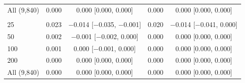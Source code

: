 \begin{tabular}{lcccc}
All (9{,}840) & 0.000 & 0.000 [0.000, 0.000] & 0.000 & 0.000 [0.000, 0.000] \\
\addlinespace
\multicolumn{5}{@{}l}{\textit{Heart, XGBoost}} \\
25 & 0.023 & $-$0.014 [$-$0.035, $-$0.001] & 0.020 & $-$0.014 [$-$0.041, 0.000] \\
50 & 0.002 & $-$0.001 [$-$0.002, 0.000] & 0.000 & 0.000 [0.000, 0.000] \\
100 & 0.001 & 0.000 [$-$0.001, 0.000] & 0.000 & 0.000 [0.000, 0.000] \\
200 & 0.000 & 0.000 [0.000, 0.000] & 0.000 & 0.000 [0.000, 0.000] \\
All (9{,}840) & 0.000 & 0.000 [0.000, 0.000] & 0.000 & 0.000 [0.000, 0.000] \\
\bottomrule
\end{tabular}

